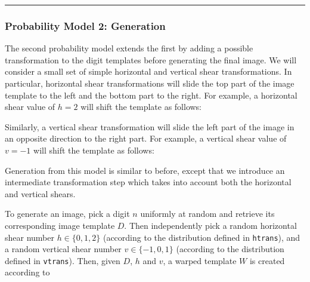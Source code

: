 \documentclass[12pt]{article}
\begin{document}
\hrule

\subsubsection*{Probability Model 2: Generation}

The second probability model extends the first by adding a possible 
transformation to the digit templates before generating the final image.
We will consider a small set of simple 
horizontal and vertical shear transformations.
In particular, horizontal shear transformations
will slide the top part of the image template to the left
and the bottom part to the right.
For example, a horizontal shear value of $h=2$ 
will shift the template as follows:

\bigskip



\noindent
Similarly, a vertical shear transformation will
slide the left part of the image
in an opposite direction to the right part.
For example, a vertical shear value of $v=-1$
will shift the template as follows:

\bigskip

\hspace*{2.2em}

\hspace*{1.49cm}

\bigskip

Generation from this model is similar to before,
except that we introduce an intermediate transformation
step which takes into account both the horizontal and
vertical shears.

\begin{center}

\end{center}

To generate an image, 
pick a digit $n$ uniformly at random 
and retrieve its corresponding image template $D$.
Then independently pick a random horizontal shear number $h\in\{0,1,2\}$
(according to the distribution defined in {\tt htrans}),
and
a random vertical shear number $v\in\{-1,0,1\}$
(according to the distribution defined in {\tt vtrans}).
Then, given $D$, $h$ and $v$, a warped template $W$ is created according to
\end{document}
